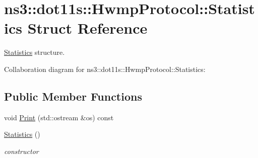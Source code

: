 \hypertarget{structns3_1_1dot11s_1_1HwmpProtocol_1_1Statistics}{}\section{ns3\+:\+:dot11s\+:\+:Hwmp\+Protocol\+:\+:Statistics Struct Reference}
\label{structns3_1_1dot11s_1_1HwmpProtocol_1_1Statistics}


\hyperlink{structns3_1_1dot11s_1_1HwmpProtocol_1_1Statistics}{Statistics} structure.  




Collaboration diagram for ns3\+:\+:dot11s\+:\+:Hwmp\+Protocol\+:\+:Statistics\+:
\subsection*{Public Member Functions}
\begin{DoxyCompactItemize}
\item 
void \hyperlink{structns3_1_1dot11s_1_1HwmpProtocol_1_1Statistics_a6b3bbfb1b173e685086058d0ddcfa5f8}{Print} (std\+::ostream \&os) const 
\item 
\hyperlink{structns3_1_1dot11s_1_1HwmpProtocol_1_1Statistics_a5f46bcfabf5b314a7a0e994eca71f937}{Statistics} ()
\begin{DoxyCompactList}\small\item\em constructor \end{DoxyCompactList}\end{DoxyCompactItemize}
